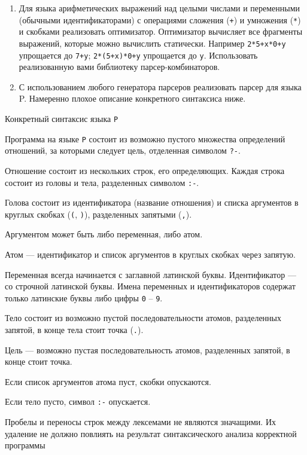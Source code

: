 \documentclass[12pt]{article}
\begin{document}
\begin{enumerate}
  \item Для языка арифметических выражений над целыми числами и переменными (обычными идентификаторами) с операциями сложения (\verb!+!) и умножения (\verb!*!) и скобками реализовать оптимизатор. Оптимизатор вычисляет все фрагменты выражений, которые можно вычислить статически. 
  Например \verb!2*5+x*0+y! упрощается до \verb!7+y!; \verb!2*(5+x)*0+y! упрощается до \verb!y!. 
  Использовать реализованную вами библиотеку парсер-комбинаторов. 
  \item С использованием любого генератора парсеров реализовать парсер для языка P. Намеренно плохое описание конкретного синтаксиса ниже.
\end{enumerate}
\newpage
\begin{center}
    \Large{Конкретный синтаксис языка \verb!P!}
\end{center}

Программа на языке \verb!P! состоит из возможно пустого множества определений отношений, за которыми следует цель, отделенная символом \verb!?-!.

Отношение состоит из нескольких строк, его определяющих. 
Каждая строка состоит из головы и тела, разделенных символом \verb!:-!. 

Голова состоит из идентификатора (название отношения) и списка аргументов в круглых скобках (\verb!(!, \verb!)!), разделенных запятыми (\verb!,!). 

Аргументом может быть либо переменная, либо атом. 

Атом --- идентификатор и список аргументов в круглых скобках через запятую. 

Переменная всегда начинается с заглавной латинской буквы. Идентификатор --- со строчной латинской буквы.
Имена переменных и идентификаторов содержат только латинские буквы либо цифры \verb!0! -- \verb!9!.

Тело состоит из возможно пустой последовательности атомов, разделенных запятой, в конце тела стоит точка (\verb!.!).

Цель --- возможно пустая последовательность атомов, разделенных запятой, в конце стоит точка. 

Если список аргументов атома пуст, скобки опускаются. 

Если тело пусто, символ \verb!:-! опускается. 

Пробелы и переносы строк между лексемами не являются значащими. Их удаление не должно повлиять на результат синтаксического анализа корректной программы
\end{document}
